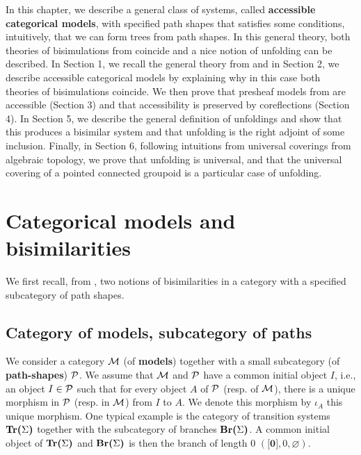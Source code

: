 In this chapter, we describe a general class of systems, called \textbf{accessible categorical models}, with specified path shapes that satisfies some conditions, intuitively, that we can form trees from path shapes. In this general theory, both theories of bisimulations from \cite{joyal96} coincide and a nice notion of unfolding can be described. In Section 1, we recall the general theory from \cite{joyal96} and in Section 2, we describe accessible categorical models by explaining why in this case both theories of bisimulations coincide. We then prove that presheaf models from \cite{joyal96} are accessible (Section 3) and that accessibility is preserved by coreflections (Section 4). In Section 5, we describe the general definition of unfoldings and show that this produces a bisimilar system and that unfolding is the right adjoint of some inclusion. Finally, in Section 6, following intuitions from universal coverings from algebraic topology, we prove that unfolding is universal, and that the universal covering of a pointed connected groupoid is a particular case of unfolding.




\section{Categorical models and bisimilarities}
\label{catmod}

We first recall, from \cite{joyal96}, two notions of bisimilarities in a category with a specified subcategory of path shapes.



\subsection{Category of models, subcategory of paths}

We consider a category $\mathcal{M}$ (of \textbf{models}) together with a small subcategory (of \textbf{path-shapes}) $\mathcal{P}$. We assume that $\mathcal{M}$ and $\mathcal{P}$ have a common initial object $I$, i.e., an object $I \in \mathcal{P}$ such that for every object $A$ of $\mathcal{P}$ (resp. of $\mathcal{M}$), there is a unique morphism in $\mathcal{P}$ (resp. in $\mathcal{M}$) from $I$ to $A$. We denote this morphism by $\iota_A$ this unique morphism. One typical example is the category of transition systems $\textbf{Tr(}\Sigma\textbf{)}$ together with the subcategory of  branches $\textbf{Br(}\Sigma\textbf{)}$. A common initial object of $\textbf{Tr(}\Sigma\textbf{)}$ and $\textbf{Br(}\Sigma\textbf{)}$ is then the branch of length $0$ $(\textbf{[0]},0,\varnothing)$.




